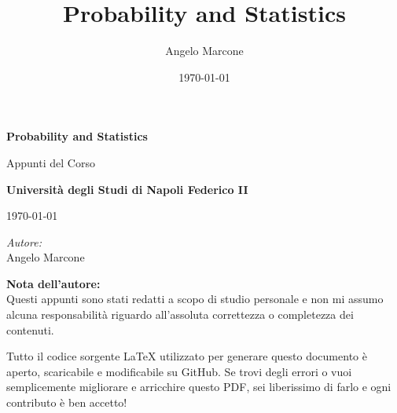 \documentclass[a4paper, 12pt]{report}
\title{Probability and Statistics}
\author{Angelo Marcone}
\date{\today} %
\theoremstyle{plain}
\theoremstyle{definition}
\theoremstyle{remark}
\begin{document}
\begin{titlepage}
    \begin{center}
        \vspace*{3cm}
        
        \Huge
        \textbf{Probability and Statistics}
        
        \vspace{0.8cm}
        \LARGE
        Appunti del Corso
        
        \vspace{2cm}
        
        \Large
        \textbf{Università degli Studi di Napoli Federico II}
        
        \vfill
        
        \large
        \today
        
        \vspace{1cm}
    \end{center}
    
    \begin{flushright}
        \small
        \textit{Autore:}\\
        Angelo Marcone
    \end{flushright}
\end{titlepage}

\clearpage
\vspace*{\fill}
\begin{center}
    \begin{minipage}{0.8\textwidth}
        \small
        \textbf{Nota dell'autore:} \\
        Questi appunti sono stati redatti a scopo di studio personale e non mi assumo alcuna responsabilità riguardo all'assoluta correttezza o completezza dei contenuti. 
        
        Tutto il codice sorgente \LaTeX{} utilizzato per generare questo documento è aperto, scaricabile e modificabile su GitHub. Se trovi degli errori o vuoi semplicemente migliorare e arricchire questo PDF, sei liberissimo di farlo e ogni contributo è ben accetto!
    \end{minipage}
\end{center}
\vspace*{2cm}
\thispagestyle{empty}
\clearpage

\tableofcontents
\newpage

\setcounter{page}{1}


\end{document}
